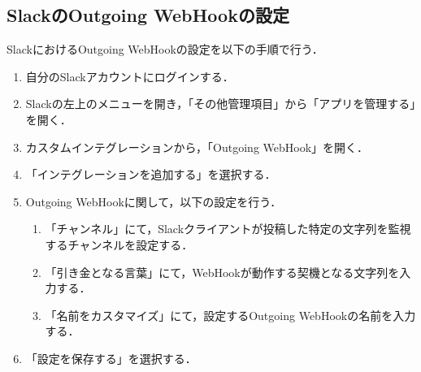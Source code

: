 \documentclass[12pt]{jsarticle}
\begin{document}
\subsection{SlackのOutgoing WebHookの設定}
SlackにおけるOutgoing WebHookの設定を以下の手順で行う．
\begin{enumerate}
\item 自分のSlackアカウントにログインする．
\item Slackの左上のメニューを開き，「その他管理項目」から「アプリを管理する」を開く．
\item カスタムインテグレーションから，「Outgoing WebHook」を開く．
\item 「インテグレーションを追加する」を選択する．
\item Outgoing WebHookに関して，以下の設定を行う．
  \begin{enumerate}
  \item 「チャンネル」にて，Slackクライアントが投稿した特定の文字列を監視するチャンネルを設定する．
  \item 「引き金となる言葉」にて，WebHookが動作する契機となる文字列を入力する．
  \item 「名前をカスタマイズ」にて，設定するOutgoing WebHookの名前を入力する．
  \end{enumerate}
\item 「設定を保存する」を選択する．
\end{enumerate}
\end{document}
